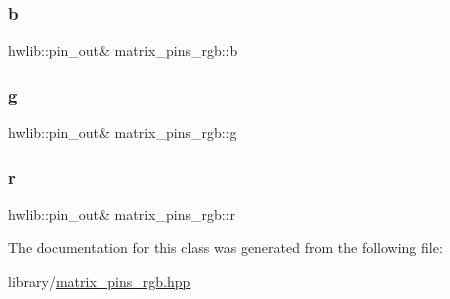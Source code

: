 \subsubsection{\texorpdfstring{b}{b}}
{\footnotesize\ttfamily hwlib\+::pin\+\_\+out\& matrix\+\_\+pins\+\_\+rgb\+::b\hspace{0.3cm}{\ttfamily [private]}}

\mbox{\label{classmatrix__pins__rgb_ad6fb34fc8a4c10d0a39631d9b5894330}} 
\subsubsection{\texorpdfstring{g}{g}}
{\footnotesize\ttfamily hwlib\+::pin\+\_\+out\& matrix\+\_\+pins\+\_\+rgb\+::g\hspace{0.3cm}{\ttfamily [private]}}

\mbox{\label{classmatrix__pins__rgb_a828561dc648f33d89d1156ada856924f}} 
\subsubsection{\texorpdfstring{r}{r}}
{\footnotesize\ttfamily hwlib\+::pin\+\_\+out\& matrix\+\_\+pins\+\_\+rgb\+::r\hspace{0.3cm}{\ttfamily [private]}}



The documentation for this class was generated from the following file\+:\begin{DoxyCompactItemize}
\item 
library/\hyperlink{matrix__pins__rgb_8hpp}{matrix\+\_\+pins\+\_\+rgb.\+hpp}\end{DoxyCompactItemize}
